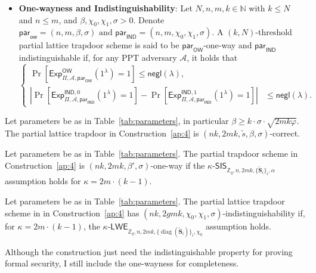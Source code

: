 \begin{definition}
\begin{itemize}
\item \textbf{One-wayness and Indistinguishability}:
Let $N,n,m,k \in \mathbb{N}$ with $k \leq N$ and $n \leq m$, and
$\beta,\chi_0,\chi_1,\sigma > 0$. Denote
$
\mathsf{par}_{\mathsf{ow}} = (n,m,\beta,\sigma)
\text{ and } 
\mathsf{par}_{\mathsf{IND}} = (n,m,\chi_0,\chi_1,\sigma).
$
A $(k,N)$-threshold partial lattice trapdoor scheme is said to be $\mathsf{par}_{\mathsf{OW}}$-one-way and $\mathsf{par}_{\mathsf{IND}}$indistinguishable if, 
for any PPT adversary $\mathcal{A}$, it holds that
\[
\left\{
\begin{aligned}
\Pr\!\left[
\mathsf{Exp}^{\mathsf{OW}}_{\Pi,\mathcal{A},\mathsf{par}_{\mathsf{OW}}}(1^\lambda)
= 1
\right]
\le
\mathsf{negl}(\lambda),
\\[1.2em]
\left|
\Pr\!\left[
\mathsf{Exp}^{\mathsf{IND},0}_{\Pi,\mathcal{A},\mathsf{par}_{\mathsf{IND}}}(1^\lambda)
= 1
\right]
-
\Pr\!\left[
\mathsf{Exp}^{\mathsf{IND},1}_{\Pi,\mathcal{A},\mathsf{par}_{\mathsf{IND}}}(1^\lambda)
= 1
\right]
\right|
&\le
\mathsf{negl}(\lambda).
\end{aligned}
\right.
\]
\end{itemize}

\end{definition}

\begin{theorem}
Let parameters be as in Table~\ref{tab:parameters}, in particular
$
    \beta \ge k \cdot \sigma \cdot \sqrt{2mk\varphi}.
$
The partial lattice trapdoor in Construction~\ref{ap:4} is
$
    (nk,2mk,\widetilde{s},\beta,\sigma)$-correct.

\end{theorem}
\begin{theorem}
\label{theo:onewayness_partitial}
Let parameters be as in Table~\ref{tab:parameters}. The partial trapdoor scheme in Construction~\ref{ap:4} is
$(nk,2mk,\beta',\sigma)$-one-way if the
$\kappa$-$\mathsf{SIS}_{\mathbb{Z}_q,n,2mk,\{\widetilde{\mathbf{S}}_i\}_i,\alpha}$
assumption holds for $\kappa = 2m\cdot(k-1)$.
\end{theorem}

\begin{theorem}
\label{theo:indistinguishibity_oneway}
Let parameters be as in Table~\ref{tab:parameters}. The partial lattice trapdoor scheme in in Construction~\ref{ap:4} has
$(nk,2gmk,\chi_0,\chi_1,\sigma)$-indistinguishability if, for
$\kappa = 2m\cdot(k-1)$, the
$\kappa$-$\mathsf{LWE}_{\mathbb{Z}_q,n,2mk,\{\operatorname{diag}(\widetilde{\mathbf{S}}_i)\}_i,\chi_0}$
assumption holds.
\end{theorem}

Although the construction just need the indistinguishable property for proving formal security, I still include the one-wayness for completeness. 

% 